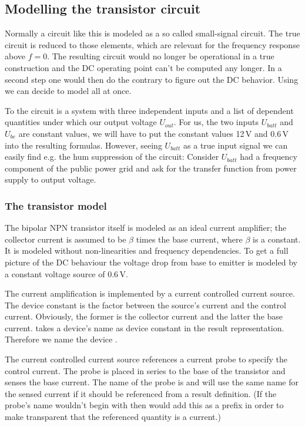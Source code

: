 \subsection{Modelling the transistor circuit}
 
Normally a circuit like this is modeled as a so called small-signal
circuit. The true circuit is reduced to those elements, which are relevant
for the frequency response above $f=0$. The resulting circuit would no
longer be operational in a true construction and the DC operating point
can't be computed any longer. In a second step one would then do the
contrary to figure out the DC behavior. Using \linnet{} we can decide to
model all at once.

To \linnet{} the circuit is a system with three independent inputs and a
list of dependent quantities under which our output voltage $U_{out}$. For
us, the two inputs $U_{batt}$ and $U_{be}$ are constant values, we will
have to put the constant values 12\,V and 0.6\,V into the resulting
formulas. However, seeing $U_{batt}$ as a true input signal we can easily
find e.g. the hum suppression of the circuit: Consider $U_{batt}$ had a
frequency component of the public power grid and ask for the transfer
function from power supply to output voltage.

\subsubsection{The transistor model}

The bipolar NPN transistor itself is modeled as an ideal current
amplifier; the collector current is assumed to be $\beta$ times the base
current, where $\beta$ is a constant. It is modeled without
non-linearities and frequency dependencies. To get a full picture of the
DC behaviour the voltage drop from base to emitter is modeled by a
constant voltage source of 0.6\,V.

The current amplification is implemented by a current controlled current
source. The device constant is the factor between the source's current and
the control current. Obviously, the former is the collector current and
the latter the base current. \linnet{} takes a device's name as device
constant in the result representation. Therefore we name the device
.

The current controlled current source references a current probe to
specify the control current. The probe is placed in series to the base of
the transistor and senses the base current. The name of the probe is
 and \linnet{} will use the same name for the sensed
current if it should be referenced from a result definition. (If the
probe's name wouldn't begin with  then \linnet{} would add this
as a prefix in order to make transparent that the referenced quantity is a
current.)


